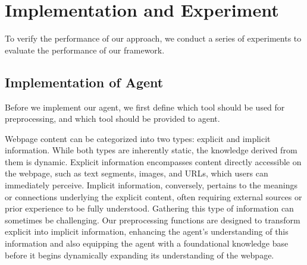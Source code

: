 


\section{Implementation and Experiment}

To verify the performance of our approach, we conduct a series of experiments to evaluate the performance of our framework. 

\subsection{Implementation of Agent}

Before we implement our agent, we first define which tool should be used for preprocessing, and which tool should be provided to agent. 

Webpage content can be categorized into two types: explicit and implicit information. While both types are inherently static, the knowledge derived from them is dynamic. Explicit information encompasses content directly accessible on the webpage, such as text segments, images, and URLs, which users can immediately perceive. Implicit information, conversely, pertains to the meanings or connections underlying the explicit content, often requiring external sources or prior experience to be fully understood. Gathering this type of information can sometimes be challenging. Our preprocessing functions are designed to transform explicit into implicit information, enhancing the agent's understanding of this information and also equipping the agent with a foundational knowledge base before it begins dynamically expanding its understanding of the webpage.

